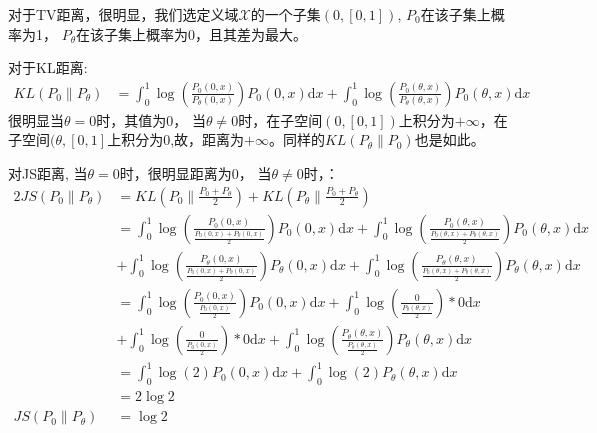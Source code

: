 对于TV距离，很明显，我们选定义域$\mathcal{X}$的一个子集$(0, [0,1])$, ${P}_0$在该子集上概率为1， ${P}_\theta$在该子集上概率为0，且其差为最大。

对于KL距离:
\begin{displaymath}
\begin{split}
KL({P}_0 \parallel {P}_\theta) &= \int_{0}^{1} \log (\frac{P_0(0,x)}{P_\theta(0,x)})P_0(0,x) \mathrm{d} x + \int_{0}^{1} \log (\frac{P_0(\theta,x)}{P_\theta(\theta,x)})P_0(\theta,x) \mathrm{d} x
\end{split}
\end{displaymath}
很明显当$\theta =0$时，其值为0， 当$\theta \neq 0$时，在子空间$(0,[0,1])$上积分为$+\infty$，在子空间$(\theta, [0,1]$上积分为0,故，距离为$+\infty$。同样的$KL({P}_\theta \parallel {P}_0)$也是如此。

对JS距离, 当$\theta =0 $时，很明显距离为0， 当$\theta \neq 0$时，：
\begin{displaymath}
\begin{split}
2JS({P}_0 \parallel {P}_\theta) 
&= KL({P}_0 \parallel \frac{{P}_0 + {P}_\theta}{2}) + KL({P}_\theta \parallel \frac{{P}_0 + {P}_\theta}{2}) \\
&= \int_{0}^{1} \log (\frac{P_0(0,x)}{\frac{P_0(0,x) + P_\theta(0,x)}{2}})P_0(0,x) \mathrm{d} x +
   \int_{0}^{1} \log (\frac{P_0(\theta,x)}{\frac{P_0(\theta,x) + P_\theta(\theta,x)}{2}})P_0(\theta,x) \mathrm{d} x\\
&+ \int_{0}^{1} \log (\frac{P_\theta(0,x)}{\frac{P_0(0,x) + P_\theta(0,x)}{2}})P_\theta(0,x) \mathrm{d} x +
   \int_{0}^{1} \log (\frac{P_\theta(\theta,x)}{\frac{P_0(\theta,x) + P_\theta(\theta,x)}{2}})P_\theta(\theta,x) \mathrm{d} x\\
&= \int_{0}^{1} \log (\frac{P_0(0,x)}{\frac{P_0(0,x)}{2}})P_0(0,x) \mathrm{d} x +
   \int_{0}^{1} \log (\frac{0}{\frac{P_\theta(\theta,x)}{2}})*0 \mathrm{d} x\\
&+ \int_{0}^{1} \log (\frac{0}{\frac{P_0(0,x)}{2}}) *0 \mathrm{d} x +
   \int_{0}^{1} \log (\frac{P_\theta(\theta,x)}{\frac{P_\theta(\theta,x)}{2}})P_\theta(\theta,x) \mathrm{d} x\\
&=  \int_{0}^{1} \log (2)P_0(0,x) \mathrm{d} x + \int_{0}^{1} \log (2)P_\theta(\theta,x) \mathrm{d} x\\
&= 2 \log 2\\
JS({P}_0 \parallel {P}_\theta) &= \log 2\\
\end{split}
\end{displaymath}

